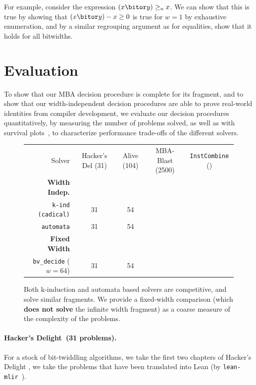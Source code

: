 For example, consider the expression $(x \bitor y) \geq_u x$.
We can show that this is true by showing that $(x \bitor y) - x \geq 0$ is true for $w = 1$ by exhaustive enumeration,
and by a similar regrouping argument as for equalities, show that it holds for all bitwidths.

\section{Evaluation}
\label{sec:swbv:evaluation}

To show that our MBA decision procedure is complete for its fragment,
and to show that our width-independent decision procedures are able to prove real-world identities from compiler development,
we evaluate our decision procedures quantitatively, by measuring the number of problems solved,
as well as with survival plots~\cite{brain2017benchmarking}, to characterize performance trade-offs of the different solvers.

\begin{figure}[htb]
{\small
\begin{tabular}{rcccc}
  Solver & Hacker's Del (31) & Alive (104) &  MBA-Blast (2500) & \texttt{InstCombine} (\InstCombineTotalProblems{}) \\
\textbf{Width Indep.} & & & & \\
\rowcolor{gray!20}
  \texttt{k-ind (cadical)} & 31 & 54 & \MBAKInductionVerifiedNumSolved{} & \textbf{\InstCombineNormCircuitVerifiedNumSolved{}} \\
\rowcolor{gray!10}
\texttt{automata} & 31 & 54 & \MBAPresburgerNumSolved{} & \InstCombineNormPresburgerNumSolved{} \\
\textbf{Fixed Width} & & & & \\
\rowcolor{gray!10}
  \texttt{bv\_decide} ($w = 64$) & 31 & 54 & \MBABvDecideNumSolved{} & \InstCombineBvDecideNumSolved{}
\end{tabular}
}
\caption{Both k-induction and automata based solvers are competitive, and solve similar fragments.
  We provide a fixed-width comparison (which \textbf{does not solve} the infinite width fragment)
  as a coarse measure of the complexity of the problems.}
\label{fig:swbv:table-eval}
\end{figure}

\noindent \paragraph{Hacker's Delight~(31 problems).}
For a stock of bit-twiddling algorithms, we take the first two chapters of Hacker's Delight \cite{warren2013hacker},
we take the problems that have been translated into Lean (by \texttt{lean-mlir}~\cite{bhat2024verifying}).

